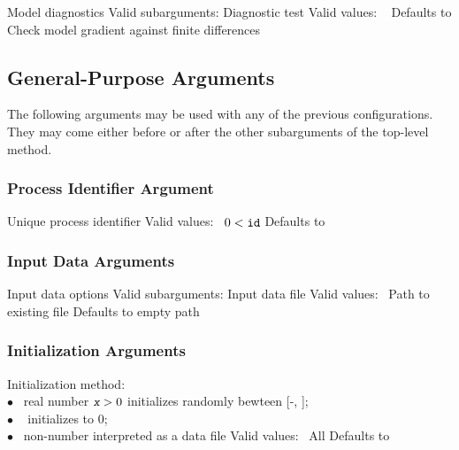\begin{description}

    {Model diagnostics}
    {Valid subarguments: }
%
      {Diagnostic test}
      {Valid values: \  }
      {Defaults to }
%
        {Check model gradient against finite differences}
%
\end{description}

\subsection{General-Purpose Arguments}

The following arguments may be used with any of the previous
configurations.   They may come either before or after the other
subarguments of the top-level method.

\subsubsection{Process Identifier Argument}

\begin{description}
  {Unique process identifier}
  {Valid values: \  $0 < \mbox{{\tt id}}$}
  {Defaults to }
%
\end{description}

\subsubsection{Input Data Arguments}

\begin{description}

  {Input data options}
  {Valid subarguments: }
%
    {Input data file}
    {Valid values: \  Path to existing file}
    {Defaults to empty path}
%
\end{description}

\subsubsection{Initialization Arguments}

\begin{description}
  {Initialization method: \\
        \hspace*{8pt} $\bullet$ \ real number $\mbox{\farg{x}} > 0$ initializes randomly bewteen [-,
        ]; 
        \\
        \hspace*{8pt} $\bullet$ \   initializes to 0; 
        \\
        \hspace*{8pt} $\bullet$ \  non-number interpreted as a data file}
  {Valid values: \  All}
  {Defaults to }
%
\end{description}


